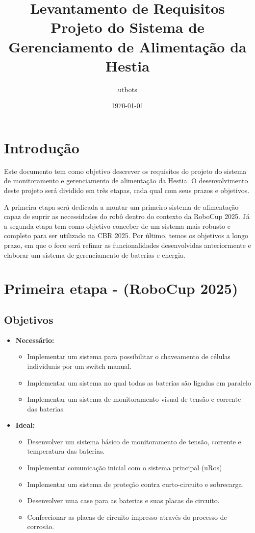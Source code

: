\documentclass[12pt]{article}
\title{Levantamento de Requisitos\\Projeto do Sistema de Gerenciamento de Alimentação da Hestia}
\author{utbots}
\date{\today}
\begin{document}
\maketitle

\tableofcontents
\newpage

\section{Introdução}

\indent Este documento tem como objetivo descrever os requisitos do projeto do sistema de monitoramento e gerenciamento de alimentação da Hestia. O desenvolvimento deste projeto será dividido em três etapas, cada qual com seus prazos e objetivos.

A primeira etapa será dedicada a montar um primeiro sistema de alimentação capaz de suprir as necessidades do robô dentro do contexto da RoboCup 2025. Já a segunda etapa tem como objetivo conceber de um sistema mais robusto e completo para ser utilizado na CBR 2025. Por último, temos os objetivos a longo prazo, em que o foco será refinar as funcionalidades desenvolvidas anteriormente e elaborar um sistema de gerenciamento de baterias e energia.

\section{Primeira etapa - (RoboCup 2025)}

\subsection{Objetivos}

\begin{itemize}
	\item \textbf{Necessário:}
	      \begin{itemize}
		      \item Implementar um sistema para possibilitar o chaveamento de células individuais por um switch manual.
		      \item Implementar um sistema no qual todas as baterias são ligadas em paralelo
		      \item Implementar um sistema de monitoramento visual de tensão e corrente das baterias
	      \end{itemize}
	\item \textbf{Ideal:}
	      \begin{itemize}
		      \item Desenvolver um sistema básico de monitoramento de tensão, corrente e temperatura das baterias.
		      \item Implementar comunicação inicial com o sistema principal (uRos)
		      \item Implementar um sistema de proteção contra curto-circuito e sobrecarga.
		      \item Desenvolver uma case para as baterias e suas placas de circuito.
		      \item Confeccionar as placas de circuito impresso através do processo de corrosão.
	      \end{itemize}
\end{itemize}
\end{document}
